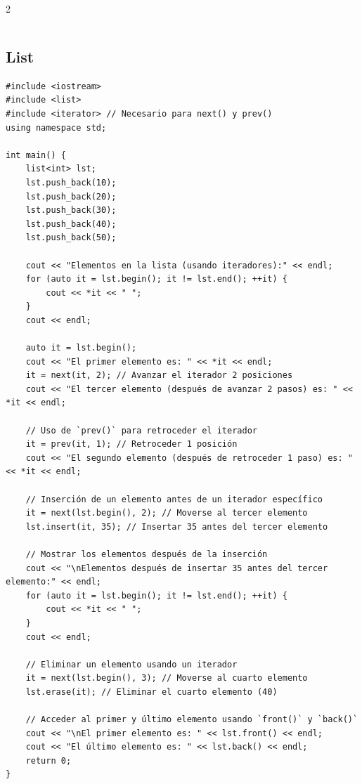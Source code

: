 \documentclass[twoside]{article}
\begin{document}
\begin{multicols*}{2}
\begin{verbatim}
\end{verbatim}

	{
		\subsection*{List}
	}
	\begin{verbatim}
#include <iostream>
#include <list>
#include <iterator> // Necesario para next() y prev()
using namespace std;

int main() {
    list<int> lst;
    lst.push_back(10);
    lst.push_back(20);
    lst.push_back(30);
    lst.push_back(40);
    lst.push_back(50);

    cout << "Elementos en la lista (usando iteradores):" << endl;
    for (auto it = lst.begin(); it != lst.end(); ++it) {
        cout << *it << " ";
    }
    cout << endl;

    auto it = lst.begin();
    cout << "El primer elemento es: " << *it << endl;
    it = next(it, 2); // Avanzar el iterador 2 posiciones
    cout << "El tercer elemento (después de avanzar 2 pasos) es: " << *it << endl;

    // Uso de `prev()` para retroceder el iterador
    it = prev(it, 1); // Retroceder 1 posición
    cout << "El segundo elemento (después de retroceder 1 paso) es: " << *it << endl;

    // Inserción de un elemento antes de un iterador específico
    it = next(lst.begin(), 2); // Moverse al tercer elemento
    lst.insert(it, 35); // Insertar 35 antes del tercer elemento

    // Mostrar los elementos después de la inserción
    cout << "\nElementos después de insertar 35 antes del tercer elemento:" << endl;
    for (auto it = lst.begin(); it != lst.end(); ++it) {
        cout << *it << " ";
    }
    cout << endl;

    // Eliminar un elemento usando un iterador
    it = next(lst.begin(), 3); // Moverse al cuarto elemento
    lst.erase(it); // Eliminar el cuarto elemento (40)

    // Acceder al primer y último elemento usando `front()` y `back()`
    cout << "\nEl primer elemento es: " << lst.front() << endl;
    cout << "El último elemento es: " << lst.back() << endl;
    return 0;
}

\end{verbatim}

	{
}
\end{multicols*}
\end{document}
